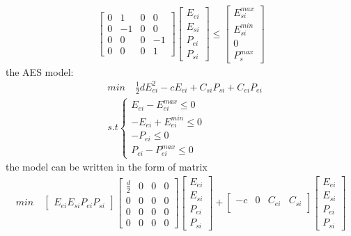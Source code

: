 \documentclass[11pt]{article} %
\begin{document}
\begin{align} 
    \begin{bmatrix}
        0 & 1 & 0 & 0\\
        0 & -1 & 0 & 0\\
        0 & 0 & 0 & -1\\
        0 & 0 & 0 & 1
    \end{bmatrix} 
    \begin{bmatrix}
        E_{ei}\\
        E_{si}\\
        P_{ei}\\
        P_{si}
    \end{bmatrix} \leq
    \begin{bmatrix}
        E_{si}^{max}\\
        E_{si}^{min}\\
        0\\
        P_{s}^{max}
    \end{bmatrix}
\end{align}
the AES model:
\begin{align}  
    &min \quad \frac{1}{2}dE_{ei}^2 -cE_{ei} + C_{si}P_{si} +  C_{ei}P_{ei}\nonumber\\
    &s.t \begin{cases}
        E_{ei} - E_{ei}^{max} \leq 0\\
         -E_{ei} + E_{ei}^{min}\leq 0\\
         -P_{ei}\leq 0\\
          P_{ei} - P_{ei}^{max} \leq 0
        \end{cases}
\end{align}
the model can be written in the form of matrix
\begin{align} 
    min \quad
    \begin{bmatrix}
        E_{ei}
        E_{si}
        P_{ei}
        P_{si}
    \end{bmatrix} 
    \begin{bmatrix}
        \frac{d}{2} & 0 & 0 & 0\\
        0 & 0  & 0 & 0\\
        0 & 0 & 0 & 0\\
        0 & 0 & 0 & 0
    \end{bmatrix} 
    \begin{bmatrix}
        E_{ei}\\
        E_{si}\\
        P_{ei}\\
        P_{si}
    \end{bmatrix} +
    \begin{bmatrix}
        -c & 0 & C_{ei} & C_{si}\\
    \end{bmatrix} 
    \begin{bmatrix}
        E_{ei}\\
        E_{si}\\
        P_{ei}\\
        P_{si}
    \end{bmatrix}
\end{align}
\end{document}
